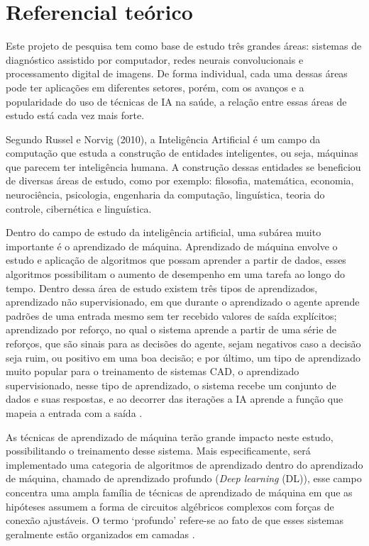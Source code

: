 \section{Referencial teórico}

Este projeto de pesquisa tem como base de estudo três grandes áreas: sistemas de diagnóstico assistido por computador, redes neurais convolucionais e processamento digital de imagens. De forma individual, cada uma dessas áreas pode ter aplicações em diferentes setores, porém, com os avanços e a popularidade do uso de técnicas de IA na saúde, a relação entre essas áreas de estudo está cada vez mais forte.


Segundo Russel e Norvig (2010), a Inteligência Artificial  é um campo da computação que estuda a construção de entidades inteligentes, ou seja, máquinas que parecem ter inteligência humana. A construção dessas entidades se beneficiou de diversas áreas de estudo, como por exemplo: filosofia, matemática, economia, neurociência, psicologia, engenharia da computação, linguística, teoria do controle, cibernética e linguística.


  Dentro do campo de estudo da inteligência artificial, uma subárea muito importante é o aprendizado de máquina. Aprendizado de máquina envolve o estudo e aplicação de algoritmos que possam aprender a partir de dados, esses algoritmos possibilitam o aumento de desempenho em uma tarefa ao longo do tempo. Dentro dessa área de estudo existem três tipos de aprendizados, aprendizado não supervisionado, em que durante o aprendizado o agente aprende padrões de uma entrada mesmo sem ter recebido valores de saída explícitos; aprendizado por reforço, no qual o sistema aprende a partir de uma série de reforços, que são sinais para as decisões do agente, sejam negativos caso a decisão seja ruim, ou positivo em uma boa decisão; e por último, um tipo de aprendizado muito popular para o treinamento de sistemas CAD, o aprendizado supervisionado, nesse tipo de aprendizado, o sistema recebe um conjunto de dados e suas respostas, e ao decorrer das iterações a IA aprende a função que mapeia a entrada com a saída \cite{haykin2009neural}.

As técnicas de aprendizado de máquina terão grande impacto neste estudo, possibilitando o treinamento desse sistema. Mais especificamente, será implementado uma categoria de algoritmos de aprendizado dentro do aprendizado de máquina, chamado de aprendizado profundo (\textit{Deep learning} (DL)), esse campo concentra uma ampla família de técnicas de aprendizado de máquina em que as hipóteses assumem a forma de circuitos algébricos complexos com forças de conexão ajustáveis. O termo ‘profundo’ refere-se ao fato de que esses sistemas geralmente estão organizados em camadas \cite{10.5555/1671238}.

